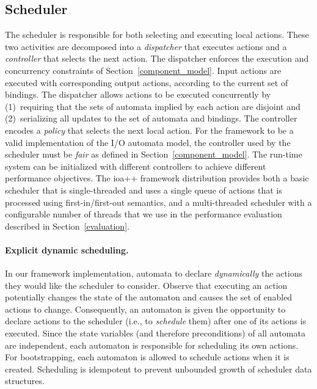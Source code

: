 \subsection{Scheduler\label{scheduling}}

The scheduler is responsible for both selecting and executing local actions.
These two activities are decomposed into a \emph{dispatcher} that executes actions and a \emph{controller} that selects the next action.
The dispatcher enforces the execution and concurrency constraints of Section~\ref{component_model}.
Input actions are executed with corresponding output actions, according to the current set of bindings.
The dispatcher allows actions to be executed concurrently by (1)~requiring that the sets of automata implied by each action are disjoint and (2)~serializing all updates to the set of automata and bindings.
The controller encodes a \emph{policy} that selects the next local action.
For the framework to be a valid implementation of the I/O automata model, the controller used by the scheduler must be \emph{fair} as defined in Section~\ref{component_model}.
The run-time system can be initialized with different controllers to achieve different performance objectives.
The ioa++ framework distribution provides both a basic scheduler that is single-threaded and uses a single queue of actions that is processed using first-in/first-out semantics, and a multi-threaded scheduler with a configurable number of threads that we use in the performance evaluation described in Section~\ref{evaluation}.

\paragraph*{Explicit dynamic scheduling.}
In our framework implementation, automata to declare \emph{dynamically} the actions they would like the scheduler to consider.
Observe that executing an action potentially changes the state of the automaton and causes the set of enabled actions to change.
Consequently, an automaton is given the opportunity to declare actions to the scheduler (i.e., to \emph{schedule} them) after one of its actions is executed.
Since the state variables (and therefore preconditions) of all automata are independent, each automaton is responsible for scheduling its own actions.
For bootstrapping, each automaton is allowed to schedule actions when it is created.
Scheduling is idempotent to prevent unbounded growth of scheduler data structures.

